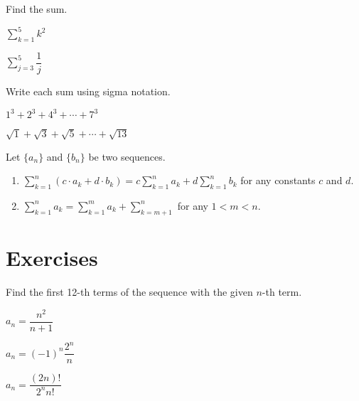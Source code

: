 \begin{example}
    Find the sum.\\
    \begin{enumerate*}
        \item $\sum\limits_{k=1}^5 k^2$
        \item $\sum\limits_{j=3}^5\dfrac{1}{j}$\hfill\null
    \end{enumerate*}
\end{example}

\begin{example}
    Write each sum using sigma notation.\\
    \begin{enumerate*}
        \item $1^3+2^3+4^3+\cdots+7^3$
        \item $\sqrt{1}+\sqrt{3}+\sqrt{5}+\cdots+\sqrt{13}$\hfill\null
    \end{enumerate*}
\end{example}

\begin{theorem} Let $\{a_n\}$ and $\{b_n\}$ be two sequences.
    \begin{enumerate}
        \item $\sum\limits_{k=1}^n (c\cdot a_k+ d\cdot b_k)=c\sum\limits_{k=1}^n a_k+d\sum\limits_{k=1}^nb_k$ for any constants $c$ and $d$.
        \item $\sum\limits_{k=1}^na_k=\sum\limits_{k=1}^m a_k +\sum\limits_{k=m+1}^n$ for any $1<m<n$.
    \end{enumerate}
\end{theorem}

\newpage

\section*{Exercises}

\begin{exercise}
    Find the first 12-th terms of the sequence with the given $n$-th term.\\
\begin{enumerate*}
    \item $a_n=\dfrac{n^2}{n+1}$
    \item $a_n=(-1)^n\dfrac{2^n}{n}$
    \item $a_n=\dfrac{(2n)!}{2^nn!}$\hfill\null
\end{enumerate*}
\end{exercise}

